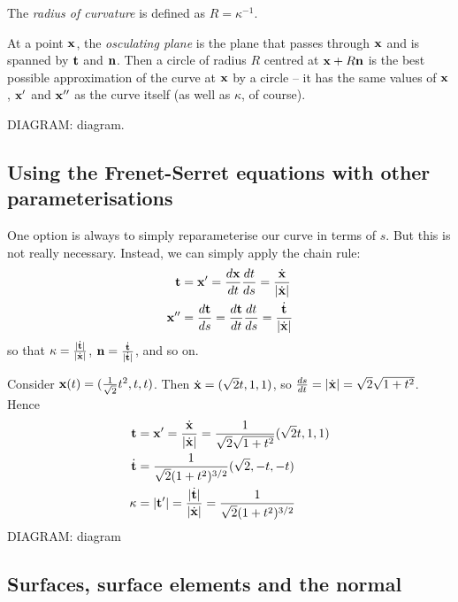 \documentclass{../../template/note}
\begin{document}
    \begin{definition*}
        The \emph{radius of curvature} is defined as \(R = \kappa^{-1}\).
    \end{definition*}
    
    At a point \(\V x\), the \emph{osculating plane} is the plane that passes through \(\V x\) and is spanned by \(\V t\) and \(\V n\). Then a circle of radius \(R\) centred at \(\V x + R \V n\) is the best possible approximation of the curve at \(\V x\) by a circle -- it has the same values of \(\V x\), \(\V x'\) and \(\V x''\) as the curve itself (as well as \(\kappa\), of course).

    DIAGRAM: diagram.
    
    \subsection{Using the Frenet-Serret equations with other parameterisations}

    One option is always to simply reparameterise our curve in terms of \(s\). But this is not really necessary. Instead, we can simply apply the chain rule:
    \begin{align*}
        \V t &= \V x' = \frac{d \V x}{dt} \frac{dt}{ds} = \frac{\dot{\V x}}{|\dot{\V x}|} \\
        \V x'' &= \frac{d\V t}{ds} = \frac{d \V t}{dt} \frac{dt}{ds} = \frac{\dot{\V t}}{|\dot{\V x}|}
    \end{align*}
    so that \(\kappa = \frac{|\dot{\V t}|}{|\dot{\V x}|}\), \(\V n = \frac{\dot{\V t}}{|\dot{\V t}|}\), and so on.
    
    \begin{example*}
        Consider \(\V x(t) = (\frac 1 {\sqrt 2}t^2, t, t)\). Then \(\dot{\V x} = (\sqrt 2 t, 1, 1)\), so \(\frac{ds}{dt} = |\dot{\V x}| = \sqrt 2 \sqrt{1 + t^2}\). Hence
        \begin{align*}
            \V t &= \V x' = \frac{\dot{\V x}}{|\dot{\V x}|} = \frac{1}{\sqrt 2 \sqrt{1+t^2}}(\sqrt 2 t, 1, 1) \\
            \dot{\V t} &= \frac{1}{\sqrt 2 (1+t^2)^{3/2}}(\sqrt 2, -t, -t) \\
            \kappa &= |\V t'| = \frac{|\dot{\V t}|}{|\dot{\V x}|} = \frac 1{\sqrt 2 (1+t^2)^{3/2}}
        \end{align*}
        DIAGRAM: diagram
    \end{example*}
    
    \subsection{Surfaces, surface elements and the normal}
\end{document}
